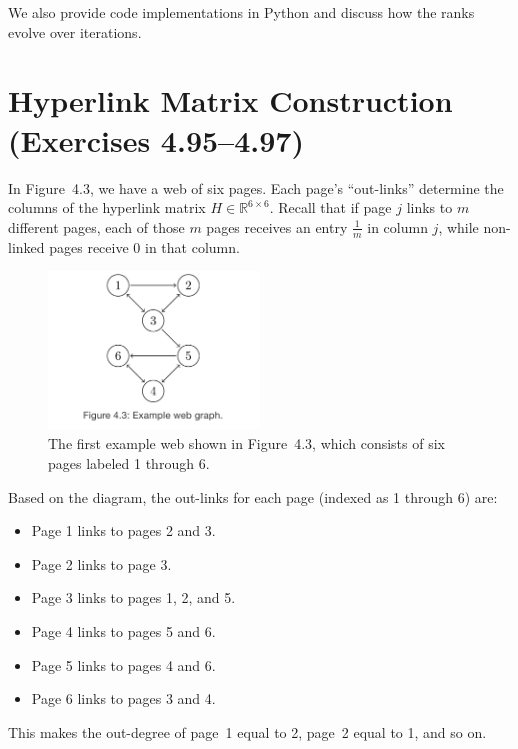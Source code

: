 \documentclass{article}
\begin{document}
We also provide code implementations in Python and discuss how the ranks evolve over iterations.

\section{Hyperlink Matrix Construction (Exercises 4.95--4.97)}

In Figure~4.3, we have a web of six pages. Each page's ``out-links'' determine the columns of the hyperlink matrix 
$H \in \mathbb{R}^{6 \times 6}$. Recall that if page $j$ links to $m$ different pages, each of those $m$ pages 
receives an entry $\tfrac{1}{m}$ in column $j$, while non-linked pages receive $0$ in that column.

\begin{figure}[ht]
  \centering
  \includegraphics[width=0.5\textwidth]{img/Node_Tree_4.3.png}
  \caption{%
    The first example web shown in Figure~4.3, which consists of six pages labeled 1 through 6.
  }
  \label{fig:Node_Tree_4.3}
\end{figure}


\newpage

Based on the diagram, the out-links for each page (indexed as 1 through 6) are:
\begin{itemize}
  \item Page 1 links to pages 2 and 3.
  \item Page 2 links to page 3.
  \item Page 3 links to pages 1, 2, and 5.
  \item Page 4 links to pages 5 and 6.
  \item Page 5 links to pages 4 and 6.
  \item Page 6 links to pages 3 and 4.
\end{itemize}
This makes the out-degree of page~1 equal to 2, page~2 equal to 1, and so on.

\bigskip
\end{document}
